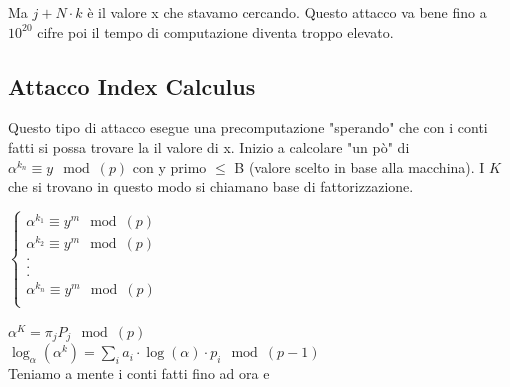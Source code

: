 \documentclass[10pt,a4paper]{article}
\begin{document}
Ma $j+N\cdot k$ è il valore x che stavamo cercando. Questo attacco va bene fino a $10^20$ cifre poi il tempo di computazione diventa troppo elevato.

\subsection{Attacco Index Calculus}
Questo tipo di attacco esegue una precomputazione "sperando" che con i conti fatti si possa trovare la il valore di x. Inizio a calcolare "un pò" di $\alpha^{k_n} \equiv y \mod(p)$ con y primo $\leq$ B (valore scelto in base alla macchina). I $K$ che si trovano in questo modo si chiamano base di fattorizzazione.
\begin{center}
$\begin{cases}
\alpha^{k_1} \equiv y^m \mod(p)\\
\alpha^{k_2} \equiv y^m \mod(p)\\
.\\
.\\
.\\
\alpha^{k_n} \equiv y^m \mod(p)\\
\end{cases}
$\\
\end{center}
$\alpha^K = \pi_{j} P_j\mod(p)$\\
$ \log_{\alpha}(\alpha^k)= \sum_{i} a_i \cdot \log(\alpha)\cdot p_i \mod(p-1)$\\
Teniamo a mente i conti fatti fino ad ora e 
\end{document}
